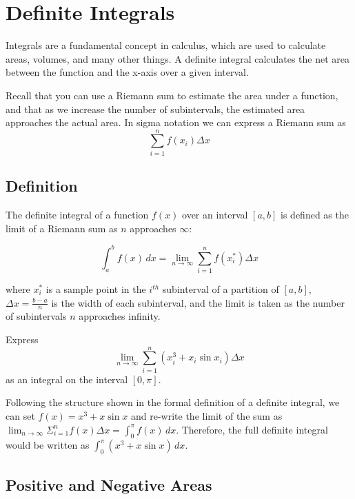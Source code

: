 \chapter{Definite Integrals}

Integrals are a fundamental concept in calculus, which are used to
calculate areas, volumes, and many other things. A definite integral
calculates the net area between the function and the x-axis over a
given interval.

Recall that you can use a Riemann sum to estimate the area under a function, and that as we increase the number of subintervals, the estimated area approaches the actual area. In sigma notation we can express a Riemann sum as $$\sum_{i=1}^{n} f(x_i)\Delta x$$

\section{Definition}

The definite integral of a function $f(x)$ over an interval $[a, b]$
is defined as the limit of a Riemann sum as $n$ approaches $\infty$:

\begin{equation}
\int_{a}^{b} f(x) \, dx = \lim_{{n \to \infty}} \sum_{i=1}^{n} f(x_i^*) \Delta x
\end{equation}

where $x_i^*$ is a sample point in the $i^{th}$ subinterval of a
partition of $[a, b]$, $\Delta x = \frac{b-a}{n}$ is the width of each
subinterval, and the limit is taken as the number of subintervals $n$
approaches infinity.

\begin{Exercise}[label=defint1]
Express $$\lim_{n \to \infty} \sum_{i=1}^{n} (x_i^3+x_i\sin{x_i})\Delta x$$ as an integral on the interval $[0, \pi]$. 
\end{Exercise}

\begin{Answer}[ref=defint1]
Following the structure shown in the formal definition of a definite integral, we can set $f(x) = x^3+x\sin{x}$ and re-write the limit of the sum as $\lim_{n \to \infty} \Sigma_{i=1}^{n} f(x)\Delta x=\int_{0}^{\pi} f(x) \, dx$. Therefore, the full definite integral would be written as $\int_{0}^{\pi} (x^3 + x\sin{x})\, dx$. 
\end{Answer}

\section{Positive and Negative Areas}


